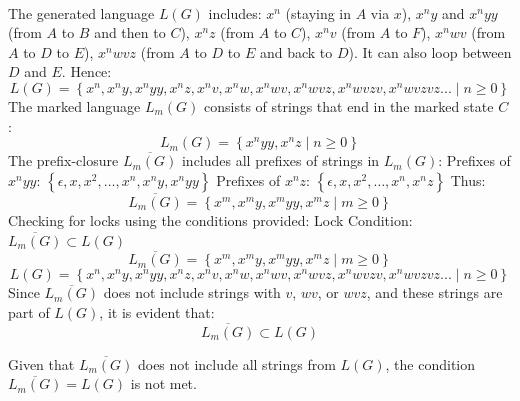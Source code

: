 \paragraph{} The generated language \(L(G)\) includes: \(x^n\) (staying in \(A\) via \(x\)), \(x^n y\) and \(x^n y y\) (from \(A\) to \(B\) and then to \(C\)), \(x^n z\) (from \(A\) to \(C\)), \(x^n v\) (from \(A\) to \(F\)), \(x^n w v\) (from \(A\) to \(D\) to \(E\)), \(x^n w v z\) (from \(A\) to \(D\) to \(E\) and back to \(D\)). It can also loop between \(D\) and \(E\). Hence:
\[
L(G) = \left\{ x^n, x^n y, x^n y y, x^n z, x^n v, x^n w, x^n w v, x^n w v z, x^n w v z v, x^n w v z v z ... \mid n \geq 0 \right\}
\]
The marked language \(L_m(G)\) consists of strings that end in the marked state \(C\):
\[
L_m(G) = \left\{ x^n y y, x^n z \mid n \geq 0 \right\}
\]
The prefix-closure \(\overline{L_m(G)}\) includes all prefixes of strings in \(L_m(G)\):
Prefixes of \(x^n y y\): \(\left\{ \epsilon, x, x^2, \ldots, x^n, x^n y, x^n y y \right\}\)
Prefixes of \(x^n z\): \(\left\{ \epsilon, x, x^2, \ldots, x^n, x^n z \right\}\)
Thus:
\[
\overline{L_m(G)} = \left\{ x^m, x^m y, x^m y y, x^m z \mid m \geq 0 \right\}
\]
Checking for locks using the conditions provided:
Lock Condition: \(\overline{L_m(G)} \subset L(G)\)
\[
\overline{L_m(G)} = \left\{ x^m, x^m y, x^m y y, x^m z \mid m \geq 0 \right\}
\]
\[
L(G) = \left\{ x^n, x^n y, x^n y y, x^n z, x^n v, x^n w, x^n w v, x^n w v z, x^n w v z v, x^n w v z v z ... \mid n \geq 0 \right\}
\]
Since \(\overline{L_m(G)}\) does not include strings with \(v\), \(w v\), or \(w v z\), and these strings are part of \(L(G)\), it is evident that:
\[
\overline{L_m(G)} \subset L(G)
\]

\noindent
Given that \(\overline{L_m(G)}\) does not include all strings from \(L(G)\), the condition \(\overline{L_m(G)} = L(G)\) is not met.

